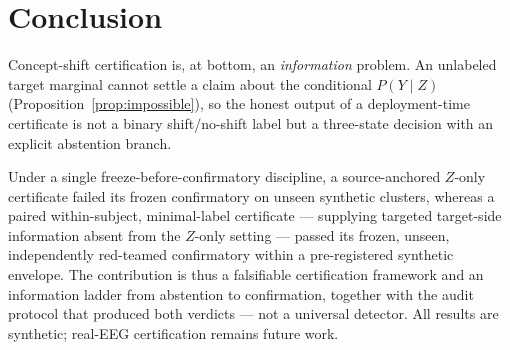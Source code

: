 \section{Conclusion}
\label{sec:conclusion}

Concept-shift certification is, at bottom, an \emph{information} problem. An unlabeled target marginal cannot
settle a claim about the conditional $P(Y\mid Z)$ (Proposition~\ref{prop:impossible}), so the honest output of
a deployment-time certificate is not a binary shift/no-shift label but a three-state decision with an explicit
abstention branch.

Under a single freeze-before-confirmatory discipline, a source-anchored $Z$-only certificate failed its frozen
confirmatory on unseen synthetic clusters, whereas a paired within-subject, minimal-label certificate ---
supplying targeted target-side information absent from the $Z$-only setting --- passed its frozen, unseen,
independently red-teamed confirmatory within a pre-registered synthetic envelope. The contribution is thus a
falsifiable certification framework and an information ladder from abstention to confirmation, together with the
audit protocol that produced both verdicts --- not a universal detector. All results are synthetic; real-EEG
certification remains future work.
